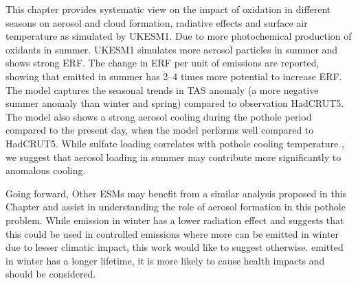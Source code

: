 This chapter provides systematic view on the impact of  oxidation in different seasons on aerosol and cloud formation, radiative effects and surface air temperature as simulated by UKESM1. Due to more photochemical production of oxidants in summer. UKESM1 simulates more aerosol particles in summer and shows strong ERF. The change in ERF per unit of  emissions are reported, showing that  emitted in summer has 2--4 times more potential to increase ERF. The model captures the seasonal trends in TAS anomaly (a more negative summer anomaly than winter and spring) compared to observation HadCRUT5. The model also shows a strong aerosol cooling during the pothole period compared to the present day, when the model performs well compared to HadCRUT5. While sulfate loading correlates with pothole cooling temperature \citep{zhangRoleAnthropogenicAerosols2021}, we suggest that aerosol loading in summer may contribute more significantly to anomalous cooling. 

Going forward, Other ESMs may benefit from a similar analysis proposed in this Chapter and assist in understanding the role of aerosol formation in this pothole problem. While  emission in winter has a lower radiation effect and \citet{bellouinRegionalSeasonalRadiative2016} suggests that this could be used in controlled emissions where more  can be emitted in winter due to lesser climatic impact, this work would like to suggest otherwise.  emitted in winter has a longer lifetime, it is more likely to cause health impacts and should be considered.


